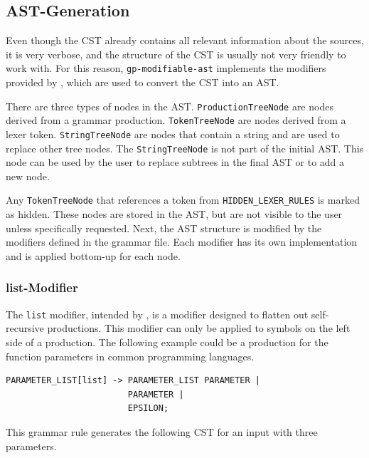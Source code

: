 \subsection{AST-Generation}
\label{chap:ast_generation}

Even though the CST already contains all relevant information about the sources, 
it is very verbose, and the structure of the CST is usually not very friendly to work with.
For this reason, \verb|gp-modifiable-ast| implements the modifiers provided by \cite{GeneratingRewritableAST}, 
which are used to convert the CST into an AST.

There are three types of nodes in the AST. \verb|ProductionTreeNode| are nodes derived from a grammar production. 
\verb|TokenTreeNode| are nodes derived from a lexer token. 
\verb|StringTreeNode| are nodes that contain a string and are used to replace other tree nodes. 
The \verb|StringTreeNode| is not part of the initial AST. 
This node can be used by the user to replace subtrees in the final AST or to add a new node.
 
Any \verb|TokenTreeNode| that references a token from \verb|HIDDEN_LEXER_RULES| is marked as hidden. 
These nodes are stored in the AST, but are not visible to the user unless specifically requested. 
Next, the AST structure is modified by the modifiers defined in the grammar file. 
Each modifier has its own implementation and is applied bottom-up for each node.

\subsubsection{list-Modifier}

The \verb|list| modifier, intended by \cite{GeneratingRewritableAST}, is a modifier designed to flatten out self-recursive productions. 
This modifier can only be applied to symbols on the left side of a production. 
The following example could be a production for the function parameters in common programming languages.

\begin{lstlisting}[caption=list modifier example]
PARAMETER_LIST[list] -> PARAMETER_LIST PARAMETER | 
                        PARAMETER | 
                        EPSILON;
\end{lstlisting}

This grammar rule generates the following CST for an input with three parameters.


